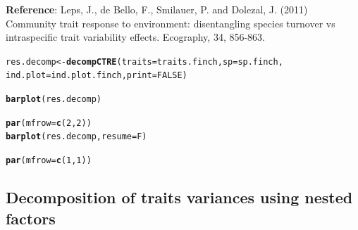 \documentclass[12pt]{article}\usepackage[]{graphicx}\usepackage[]{color}
\makeatletter
\newcommand{\hlnum}[1]{\textcolor[rgb]{0.686,0.059,0.569}{#1}}%
\newcommand{\hlstd}[1]{\textcolor[rgb]{0.345,0.345,0.345}{#1}}%
\newcommand{\hlkwb}[1]{\textcolor[rgb]{0.69,0.353,0.396}{#1}}%
\newcommand{\hlkwc}[1]{\textcolor[rgb]{0.333,0.667,0.333}{#1}}%
\newcommand{\hlkwd}[1]{\textcolor[rgb]{0.737,0.353,0.396}{\textbf{#1}}}%
\newenvironment{kframe}{%
 \def\at@end@of@kframe{}%
 \ifinner\ifhmode%
  \def\at@end@of@kframe{\end{minipage}}%
  \begin{minipage}{\columnwidth}%
 \fi\fi%
 \def\FrameCommand##1{\hskip\@totalleftmargin \hskip-\fboxsep
 \colorbox{shadecolor}{##1}\hskip-\fboxsep
     \hskip-\linewidth \hskip-\@totalleftmargin \hskip\columnwidth}%
 \MakeFramed {\advance\hsize-\width
   \@totalleftmargin\z@ \linewidth\hsize
   \@setminipage}}%
 {\par\unskip\endMakeFramed%
 \at@end@of@kframe}
\newenvironment{knitrout}{}{} %
\makeatother
\begin{document}
\textbf{Reference}: Leps, J., de Bello, F., Smilauer, P. and Dolezal, J. (2011) Community trait response to environment: disentangling species turnover vs intraspecific trait variability effects. Ecography, 34, 856-863.

\begin{knitrout}
\color{fgcolor}\begin{kframe}
\begin{alltt}
\hlstd{res.decomp}\hlkwb{<-}\hlkwd{decompCTRE}\hlstd{(}\hlkwc{traits} \hlstd{= traits.finch,} \hlkwc{sp} \hlstd{= sp.finch,}
              \hlkwc{ind.plot} \hlstd{= ind.plot.finch,} \hlkwc{print} \hlstd{=} \hlnum{FALSE}\hlstd{)}
\end{alltt}


{\ttfamily\noindent\bfseries{}}\begin{alltt}
\hlkwd{barplot}\hlstd{(res.decomp)}
\end{alltt}


{\ttfamily\noindent\bfseries\color{errorcolor}{\#\# Error: objet 'res.decomp' introuvable}}\end{kframe}
\end{knitrout}

\begin{knitrout}
\color{fgcolor}\begin{kframe}
\begin{alltt}
\hlkwd{par}\hlstd{(}\hlkwc{mfrow} \hlstd{=} \hlkwd{c}\hlstd{(}\hlnum{2}\hlstd{,}\hlnum{2}\hlstd{))}
\hlkwd{barplot}\hlstd{(res.decomp,} \hlkwc{resume} \hlstd{= F)}
\end{alltt}


{\ttfamily\noindent\bfseries\color{errorcolor}{\#\# Error: objet 'res.decomp' introuvable}}\begin{alltt}
\hlkwd{par}\hlstd{(}\hlkwc{mfrow} \hlstd{=} \hlkwd{c}\hlstd{(}\hlnum{1}\hlstd{,}\hlnum{1}\hlstd{))}
\end{alltt}
\end{kframe}
\end{knitrout}

\newpage

\subsection{Decomposition of traits variances using nested factors}
\end{document}
